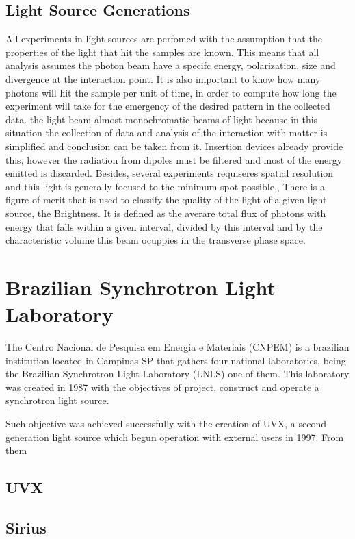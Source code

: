 \documentclass[
	12pt,				%
	openright,			%
	oneside,			%
	a4paper,		%
	chapter=TITLE,		%
	section=TITLE,		%
    brazil,				%
	english,			%
	sumario=tradicional,
	]{abntex2}
\begin{document}
    \subsection{Light Source Generations}

    All experiments in light sources are perfomed with the assumption that the properties of the light that hit the samples are known. This means that all analysis assumes the photon beam have a specifc energy, polarization, size and divergence at the interaction point. It is also important to know how many photons will hit the sample per unit of time, in order to compute how long the experiment will take for the emergency of the desired pattern in the collected data. the light beam  almost monochromatic beams of light because in this situation the collection of data and analysis of the interaction with matter is simplified and conclusion can be taken from it. Insertion devices already provide this, however the radiation from dipoles must be filtered and most of the energy emitted is discarded. Besides, several experiments requiseres spatial resolution and this light is generally focused to the minimum spot possible,,   There is a figure of merit that is used to classify the quality of the light of a given light source, the Brightness. It is defined as the averare total flux of photons with energy that falls within a given interval, divided by this interval and by the characteristic volume this beam ocuppies in the transverse phase space.

  \section{Brazilian Synchrotron Light Laboratory}

  The Centro Nacional de Pesquisa em Energia e Materiais (CNPEM) is a brazilian institution located in Campinas-SP that gathers four national laboratories, being the Brazilian Synchrotron Light Laboratory (LNLS) one of them. This laboratory was created in 1987 with the objectives of project, construct and operate a synchrotron light source.

  Such objective was achieved successfully with the creation of UVX, a second generation light source which begun operation with external users in 1997. From them

    \subsection{UVX}
    \subsection{Sirius}
\end{document}
